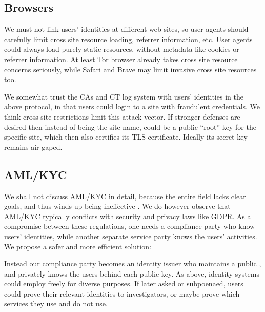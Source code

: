 \subsection{Browsers}

We must not link users' identities at different web sites, so user agents
should carefully limit cross site resource loading, referrer information, etc.
User agents could always load purely static resources, without metadata
like cookies or referrer information.
At least Tor browser already takes cross site resource concerns seriously,
while Safari and Brave may limit invasive cross site resources too.

We somewhat trust the CAs and CT log system with users' identities in
the above protocol, in that users could login to a site with fraudulent
credentials.  We think cross site restrictions limit this attack vector.
If stronger defenses are desired then instead of \msg being the site name,
\msg could be a public ``root'' key for the specific site, which then
also certifies its TLS certificate.  Ideally its secret key remains air gaped.


\subsection{AML/KYC}
\label{subsec:AML_KYC}

We shall not discuss AML/KYC in detail, because the entire field lacks
clear goals, and thus winds up being ineffective
 \cite{doi:10.1080/25741292.2020.1725366}.
We do however observe that AML/KYC typically conflicts with security
and privacy laws like GDPR.  As a compromise between these regulations,
one needs a compliance party who know users' identities,
 while another separate service party knows the users' activities.
We propose a safer and more efficient solution:

Instead our compliance party becomes an identity issuer who maintains
a public \ring, and privately knows the users behind each public key.
As above, identity systems could employ \ring freely for diverse purposes.
If later asked or subpoenaed, users could prove their relevant identities
to investigators, or maybe prove which services they use and do not use. 

